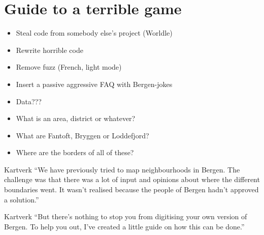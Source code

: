 \section{Guide to a terrible game}
\begin{frame}
    \begin{itemize}[<+->]
        \item Steal code from somebody else's project (Worldle)
        \item Rewrite horrible code
        \item Remove fuzz (French, light mode)
        \item Insert a passive aggressive FAQ with Bergen-jokes
        \item Data???
        \item What is an area, district or whatever?
        \item What are Fantoft, Bryggen or Loddefjord?
        \item Where are the borders of all of these?
    \end{itemize}
\end{frame}

\begin{frame}
    \begin{block}{Kartverk}
        \enquote{We have previously tried to map neighbourhoods in Bergen. The challenge was that there was a lot of input and opinions about where the different boundaries went. It wasn't realised because the people of Bergen hadn't approved a solution.}
    \end{block}
    \pause
    \begin{block}{Kartverk}
        \enquote{But there's nothing to stop you from digitising your own version of Bergen. To help you out, I've created a little guide on how this can be done.}
    \end{block}
\end{frame}